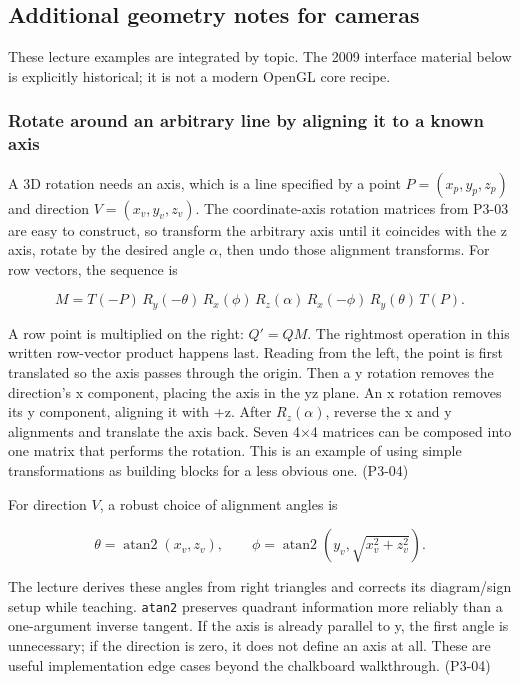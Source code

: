 \subsection{Additional geometry notes for cameras}\label{03-visual-computing-i-ch011-additional-geometry-notes-for-cameras}

These lecture examples are integrated by topic. The 2009 interface material below is explicitly historical; it is not a modern OpenGL core recipe.

\subsubsection{Rotate around an arbitrary line by aligning it to a known axis}\label{03-visual-computing-i-ch011-rotate-around-an-arbitrary-line-by-aligning-it-to-a-known-axis}

A 3D rotation needs an axis, which is a line specified by a point \(P=(x_p,y_p,z_p)\) and direction \(V=(x_v,y_v,z_v)\). The coordinate-axis rotation matrices from P3-03 are easy to construct, so transform the arbitrary axis until it coincides with the z axis, rotate by the desired angle \(\alpha\), then undo those alignment transforms. For row vectors, the sequence is

\[
M=T(-P)\,R_y(-\theta)\,R_x(\phi)\,R_z(\alpha)\,R_x(-\phi)\,R_y(\theta)\,T(P).
\]

A row point is multiplied on the right: \(Q'=QM\). The rightmost operation in this written row-vector product happens last. Reading from the left, the point is first translated so the axis passes through the origin. Then a y rotation removes the direction's x component, placing the axis in the yz plane. An x rotation removes its y component, aligning it with +z. After \(R_z(\alpha)\), reverse the x and y alignments and translate the axis back. Seven 4×4 matrices can be composed into one matrix that performs the rotation. This is an example of using simple transformations as building blocks for a less obvious one. (P3-04)

For direction \(V\), a robust choice of alignment angles is

\[
\theta=\operatorname{atan2}(x_v,z_v),\qquad
\phi=\operatorname{atan2}\left(y_v,\sqrt{x_v^2+z_v^2}\right).
\]

The lecture derives these angles from right triangles and corrects its diagram/sign setup while teaching. \texttt{atan2} preserves quadrant information more reliably than a one-argument inverse tangent. If the axis is already parallel to y, the first angle is unnecessary; if the direction is zero, it does not define an axis at all. These are useful implementation edge cases beyond the chalkboard walkthrough. (P3-04)


